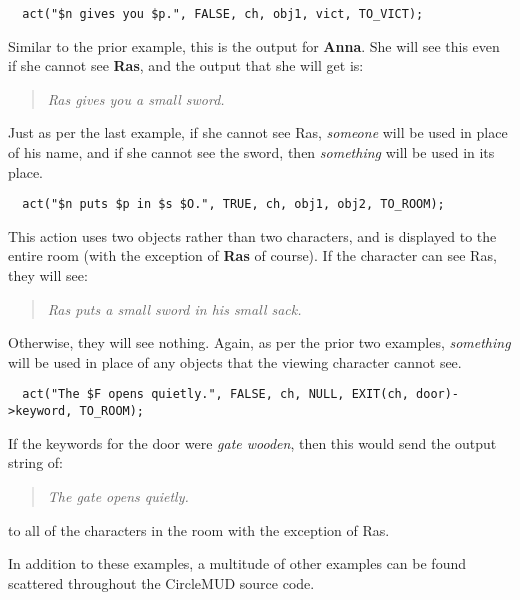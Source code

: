 \documentclass[11pt]{article}
\begin{document}
\begin{verbatim}
  act("$n gives you $p.", FALSE, ch, obj1, vict, TO_VICT);
\end{verbatim}
Similar to the prior example, this is the output for {\bf Anna}.  She will see this even if she cannot see {\bf Ras}, and the output that she will get is:
\begin{quote}
{\em Ras gives you a small sword.}
\end{quote}
Just as per the last example, if she cannot see Ras, {\it someone} will be used in place of his name, and if she cannot see the sword, then {\it something} will be used in its place.

\begin{verbatim}
  act("$n puts $p in $s $O.", TRUE, ch, obj1, obj2, TO_ROOM);
\end{verbatim}
This action uses two objects rather than two characters, and is displayed to the entire room (with the exception of {\bf Ras} of course).  If the character can see Ras, they will see:
\begin{quote}
{\em Ras puts a small sword in his small sack.}
\end{quote}
Otherwise, they will see nothing.  Again, as per the prior two examples, {\it something} will be used in place of any objects that the viewing character cannot see.

\begin{verbatim}
  act("The $F opens quietly.", FALSE, ch, NULL, EXIT(ch, door)->keyword, TO_ROOM);
\end{verbatim}
If the keywords for the door were {\it gate wooden}, then this would send the output string of:
\begin{quote}
{\em The gate opens quietly.}
\end{quote}
to all of the characters in the room with the exception of Ras.
\par
In addition to these examples, a multitude of other examples can be found scattered throughout the CircleMUD source code.
\appendix
%
%
\newpage
\pagestyle{empty}
\setlength{\topskip}{0cm}
\setlength{\footskip}{0cm}
\end{document}
